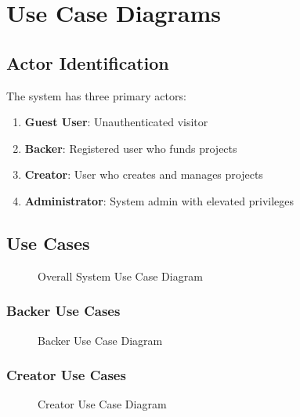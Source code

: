 \documentclass[a4paper,12pt]{report}
\begin{document}
\section{Use Case Diagrams}

\subsection{Actor Identification}

The system has three primary actors:
\begin{enumerate}
    \item \textbf{Guest User}: Unauthenticated visitor
    \item \textbf{Backer}: Registered user who funds projects
    \item \textbf{Creator}: User who creates and manages projects
    \item \textbf{Administrator}: System admin with elevated privileges
\end{enumerate}

\subsection{Use Cases}

\begin{figure}[h]
    \centering
    \caption{Overall System Use Case Diagram}
    \label{fig:usecase-overall}
\end{figure}

\subsubsection{Backer Use Cases}

\begin{figure}[h]
    \centering
    \caption{Backer Use Case Diagram}
    \label{fig:usecase-backer}
\end{figure}

\subsubsection{Creator Use Cases}

\begin{figure}[h]
    \centering
    \caption{Creator Use Case Diagram}
    \label{fig:usecase-creator}
\end{figure}
\end{document}
